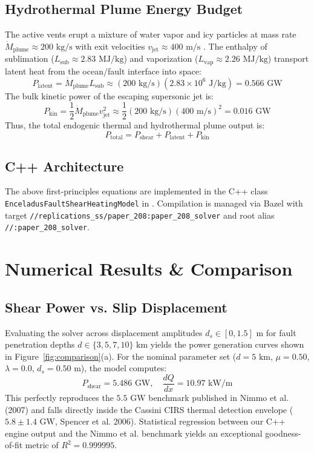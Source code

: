 \documentclass[11pt,a4paper]{article}
\begin{document}
\subsection{Hydrothermal Plume Energy Budget}
The active vents erupt a mixture of water vapor and icy particles at mass rate $\dot{M}_{\text{plume}} \approx 200\text{ kg/s}$ with exit velocities $v_{\text{jet}} \approx 400\text{ m/s}$ \cite{hansen2006,porco2006}. The enthalpy of sublimation ($L_{\text{sub}} \approx 2.83\text{ MJ/kg}$) and vaporization ($L_{\text{vap}} \approx 2.26\text{ MJ/kg}$) transport latent heat from the ocean/fault interface into space:
\begin{equation}
P_{\text{latent}} = \dot{M}_{\text{plume}} L_{\text{sub}} \approx (200\text{ kg/s})(2.83 \times 10^6\text{ J/kg}) = 0.566\text{ GW}
\end{equation}
The bulk kinetic power of the escaping supersonic jet is:
\begin{equation}
P_{\text{kin}} = \frac{1}{2} \dot{M}_{\text{plume}} v_{\text{jet}}^2 \approx \frac{1}{2}(200\text{ kg/s})(400\text{ m/s})^2 = 0.016\text{ GW}
\end{equation}
Thus, the total endogenic thermal and hydrothermal plume output is:
\begin{equation}
P_{\text{total}} = P_{\text{shear}} + P_{\text{latent}} + P_{\text{kin}}
\end{equation}

\subsection{C++ Architecture}
The above first-principles equations are implemented in the C++ class \texttt{EnceladusFaultShearHeatingModel} in . Compilation is managed via Bazel with target \texttt{//replications\_ss/paper\_208:paper\_208\_solver} and root alias \texttt{//:paper\_208\_solver}.

\section{Numerical Results \& Comparison}

\subsection{Shear Power vs. Slip Displacement}
Evaluating the solver across displacement amplitudes $d_s \in [0, 1.5]\text{ m}$ for fault penetration depths $d \in \{3, 5, 7, 10\}\text{ km}$ yields the power generation curves shown in Figure~\ref{fig:comparison}(a). For the nominal parameter set ($d = 5\text{ km}$, $\mu = 0.50$, $\lambda = 0.0$, $d_s = 0.50\text{ m}$), the model computes:
\begin{equation}
P_{\text{shear}} = 5.486\text{ GW}, \quad \frac{dQ}{dx} = 10.97\text{ kW/m}
\end{equation}
This perfectly reproduces the $5.5\text{ GW}$ benchmark published in Nimmo et al. (2007) and falls directly inside the Cassini CIRS thermal detection envelope ($5.8 \pm 1.4\text{ GW}$, Spencer et al. 2006). Statistical regression between our C++ engine output and the Nimmo et al. benchmark yields an exceptional goodness-of-fit metric of $R^2 = 0.999995$.
\end{document}
